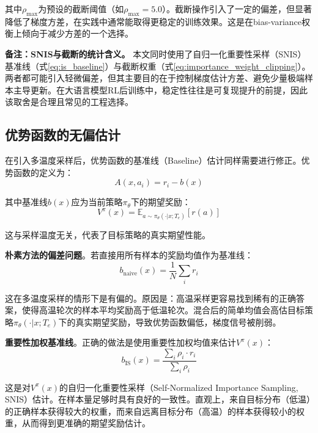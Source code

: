 其中$\rho_{\max}$为预设的截断阈值（如$\rho_{\max} = 5.0$）。截断操作引入了一定的偏差，但显著降低了梯度方差，在实践中通常能取得更稳定的训练效果。这是在bias-variance权衡上倾向于减少方差的一个选择。

\textbf{备注：SNIS与截断的统计含义。} 本文同时使用了自归一化重要性采样（SNIS）基准线（式\ref{eq:is_baseline}）与截断权重（式\ref{eq:importance_weight_clipping}）。两者都可能引入轻微偏差，但其主要目的在于控制梯度估计方差、避免少量极端样本主导更新。在大语言模型RL后训练中，稳定性往往是可复现提升的前提，因此该取舍是合理且常见的工程选择。

\subsection{优势函数的无偏估计}
\label{subsec:advantage_function_unbiased}

在引入多温度采样后，优势函数的基准线（Baseline）估计同样需要进行修正。优势函数的定义为：
\begin{equation}
A(x, a_i) = r_i - b(x)
\label{eq:advantage_definition}
\end{equation}

其中基准线$b(x)$应为当前策略$\pi_\theta$下的期望奖励：
\begin{equation}
V^\pi(x) = \mathbb{E}_{a \sim \pi_\theta(\cdot|x; T_e)} [r(a)]
\label{eq:value_function}
\end{equation}

这与采样温度无关，代表了目标策略的真实期望性能。

\textbf{朴素方法的偏差问题}。若直接用所有样本的奖励均值作为基准线：
\begin{equation}
b_{\text{naive}}(x) = \frac{1}{N} \sum_i r_i
\label{eq:naive_baseline}
\end{equation}

这在多温度采样的情形下是有偏的。原因是：高温采样更容易找到稀有的正确答案，使得高温轮次的样本平均奖励高于低温轮次。混合后的简单均值会高估目标策略$\pi_\theta(\cdot|x; T_e)$下的真实期望奖励，导致优势函数偏低，梯度信号被削弱。

\textbf{重要性加权基准线}。正确的做法是使用重要性加权均值来估计$V^\pi(x)$：
\begin{equation}
b_{\text{IS}}(x) = \frac{\sum_i \rho_i \cdot r_i}{\sum_i \rho_i}
\label{eq:is_baseline}
\end{equation}

这是对$V^\pi(x)$的自归一化重要性采样（Self-Normalized Importance Sampling, SNIS）估计。在样本量足够时具有良好的一致性。直观上，来自目标分布（低温）的正确样本获得较大的权重，而来自远离目标分布（高温）的样本获得较小的权重，从而得到更准确的期望奖励估计。

